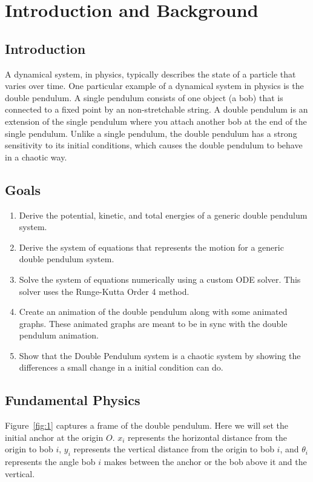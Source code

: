 \section{Introduction and Background}
\subsection{Introduction}
A dynamical system, in physics, typically describes the state of a particle that varies over time. One particular example of a dynamical system in physics is the double pendulum. A single pendulum consists of one object (a bob) that is connected to a fixed point by an non-stretchable string. A double pendulum is an extension of the single pendulum where you attach another bob at the end of the single pendulum. Unlike a single pendulum, the double pendulum has a strong sensitivity to its initial conditions, which causes the double pendulum to behave in a chaotic way. 

\subsection{Goals}
\begin{enumerate}
    \item Derive the potential, kinetic, and total energies of a generic double pendulum system.
    \item Derive the system of equations that represents the motion for a generic double pendulum system.
    \item Solve the system of equations numerically using a custom ODE solver. This solver uses the Runge-Kutta Order 4 method.
    \item Create an animation of the double pendulum along with some animated graphs. These animated graphs are meant to be in sync with the double pendulum animation.
    \item Show that the Double Pendulum system is a chaotic system by showing the differences a small change in a initial condition can do.
\end{enumerate}

\subsection{Fundamental Physics}
Figure~\ref{fig:1} captures a frame of the double pendulum. Here we will set the initial anchor at the origin $O$. $x_i$ represents the horizontal distance from the origin to bob $i$, $y_i$ represents the vertical distance from the origin to bob $i$, and $\theta_i$ represents the angle bob $i$ makes between the anchor or the bob above it and the vertical. \\

